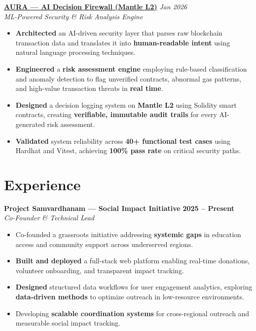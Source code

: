 \documentclass[a4paper,10pt]{article}
\begin{document}
\vspace{4pt}

\textbf{\href{https://github.com/let-the-dreamers-rise/aura-decision-firewall}{AURA --- AI Decision Firewall (Mantle L2)}} \hfill \textit{Jan 2026} \\
\textit{ML-Powered Security \& Risk Analysis Engine}
\begin{itemize}
    \item \textbf{Architected} an AI-driven security layer that parses raw blockchain transaction data and translates it into \textbf{human-readable intent} using natural language processing techniques.
    \item \textbf{Engineered} a \textbf{risk assessment engine} employing rule-based classification and anomaly detection to flag unverified contracts, abnormal gas patterns, and high-value transaction threats in \textbf{real time}.
    \item \textbf{Designed} a decision logging system on \textbf{Mantle L2} using Solidity smart contracts, creating \textbf{verifiable, immutable audit trails} for every AI-generated risk assessment.
    \item \textbf{Validated} system reliability across \textbf{40+ functional test cases} using Hardhat and Vitest, achieving \textbf{100\% pass rate} on critical security paths.
\end{itemize}
\section{Experience}

\textbf{Project Samvardhanam --- Social Impact Initiative} \hfill \textbf{2025 -- Present} \\
\textit{Co-Founder \& Technical Lead}
\begin{itemize}
    \item Co-founded a grassroots initiative addressing \textbf{systemic gaps} in education access and community support across underserved regions.
    \item \textbf{Built and deployed} a full-stack web platform enabling real-time donations, volunteer onboarding, and transparent impact tracking.
    \item \textbf{Designed} structured data workflows for user engagement analytics, exploring \textbf{data-driven methods} to optimize outreach in low-resource environments.
    \item Developing \textbf{scalable coordination systems} for cross-regional outreach and measurable social impact tracking.
\end{itemize}
\end{document}
